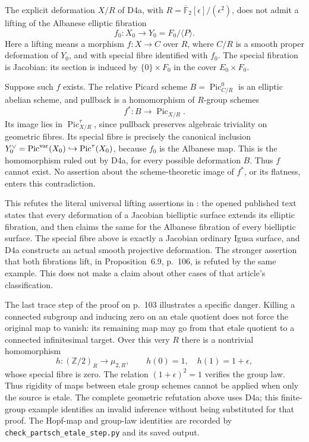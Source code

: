 The explicit deformation $X/R$ of D4a, with
$R=\overline{\mathbb F}_2[\epsilon]/(\epsilon^2)$, does not
admit a lifting of the Albanese elliptic fibration
\[
 f_0:X_0\longrightarrow Y_0=F_0/\langle P\rangle.
\]
Here a lifting means a morphism $f:X\to C$ over $R$, where
$C/R$ is a smooth proper deformation of $Y_0$, and with
special fibre identified with $f_0$. The special fibration is
Jacobian: its section is induced by $\{0\}\times F_0$ in the
cover $E_0\times F_0$.

Suppose such $f$ exists. The relative Picard scheme
$B=\operatorname{Pic}^0_{C/R}$ is an elliptic abelian scheme,
and pullback is a homomorphism of $R$-group schemes
\[
 f^*:B\longrightarrow\operatorname{Pic}_{X/R}.
\]
Its image lies in $\operatorname{Pic}^{\tau}_{X/R}$, since
pullback preserves algebraic triviality on geometric fibres.
Its special fibre is precisely the canonical inclusion
$Y_0^\vee=\operatorname{Pic}^{\rm var}(X_0)
\hookrightarrow\operatorname{Pic}^{\tau}(X_0)$, because $f_0$
is the Albanese map. This is the homomorphism ruled out by
D4a, for every possible deformation $B$. Thus $f$ cannot
exist. No assertion about the scheme-theoretic image of
$f^*$, or its flatness, enters this contradiction.

This refutes the literal universal lifting assertions in
\cite[Proposition 6.6, pp.~102--103; Theorem 6.7, p.~104]{DGJ_Partsch2013}:
the opened published text states that every deformation of
a Jacobian bielliptic surface extends its elliptic fibration,
and then claims the same for the Albanese fibration of every
bielliptic surface. The special fibre above is exactly a
Jacobian ordinary Igusa surface, and D4a constructs an actual
smooth projective deformation. The stronger assertion that
both fibrations lift, in Proposition~6.9, p.~106, is refuted
by the same example. This does not make a claim about other
cases of that article's classification.

The last trace step of the proof on p.~103 illustrates a
specific danger. Killing a connected subgroup and inducing
zero on an etale quotient does not force the original map to
vanish: its remaining map may go from that etale quotient to
a connected infinitesimal target. Over this very $R$ there
is a nontrivial homomorphism
\[
 h:(\mathbb Z/2)_R\longrightarrow\mu_{2,R},\qquad
 h(0)=1,\quad h(1)=1+\epsilon,
\]
whose special fibre is zero. The relation
$(1+\epsilon)^2=1$ verifies the group law. Thus rigidity of
maps between etale group schemes cannot be applied when
only the source is etale. The complete geometric refutation
above uses D4a; this finite-group example identifies an
invalid inference without being substituted for that proof.
The Hopf-map and group-law identities are recorded by
\texttt{check\_partsch\_etale\_step.py} and its saved output.


